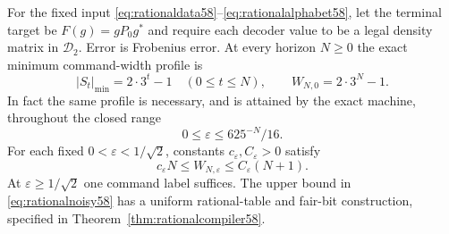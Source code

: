 \begin{theorem}
\label{thm:rationalseparation58}
For the fixed input \eqref{eq:rationaldata58}--\eqref{eq:rationalalphabet58},
let the terminal target be $F(g)=gP_0g^*$ and require each decoder value
to be a legal density matrix in $\mathcal D_2$. Error is Frobenius error.
At every horizon $N\ge0$ the exact minimum command-width profile is
\begin{equation}\label{eq:rationalprofile58}
             |S_t|_{\min}=2\cdot3^t-1\quad(0\le t\le N),
       \qquad W_{N,0}=2\cdot3^N-1.
\end{equation}
In fact the same profile is necessary, and is attained by the exact
machine, throughout the closed range
\begin{equation}\label{eq:robustendpoint58}
                      0\le\varepsilon\le625^{-N}/16.
\end{equation}
For each fixed $0<\varepsilon<1/\sqrt2$, constants $c_\varepsilon,
C_\varepsilon>0$ satisfy
\begin{equation}\label{eq:rationalnoisy58}
 c_\varepsilon N
       \le W_{N,\varepsilon}\le C_\varepsilon(N+1).
\end{equation}
At $\varepsilon\ge1/\sqrt2$ one command label suffices. The upper bound
in \eqref{eq:rationalnoisy58} has a uniform rational-table and fair-bit
construction, specified in Theorem~\ref{thm:rationalcompiler58}.
\end{theorem}

